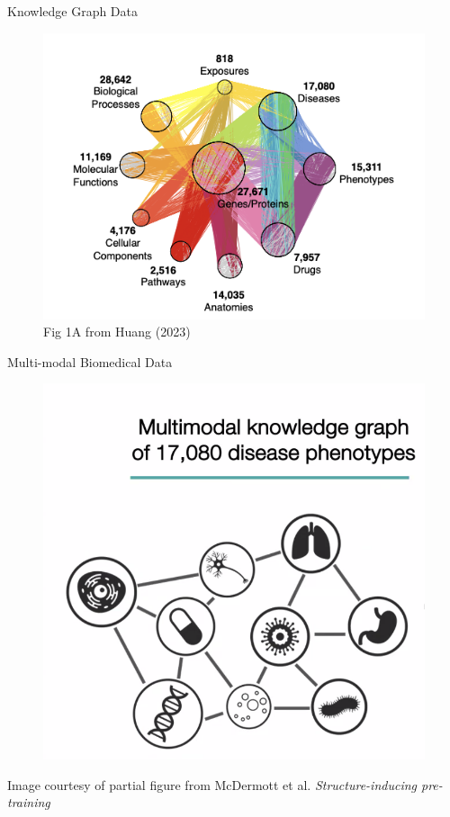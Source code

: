 \documentclass{beamer}
\begin{document}
\begin{frame}{Knowledge Graph Data}
    \begin{figure}
        \centering 
        \includegraphics{txGNN_KG.png}
        \caption{Fig 1A from Huang (2023) \cite{huang_zero-shot_2023}}
    \end{figure}
\end{frame}
\begin{frame}{Multi-modal Biomedical Data}
    \begin{figure}
        \centering 
        \includegraphics[scale=0.2]{MultimodalPreview.png}
    \end{figure}
    Image courtesy of partial figure from McDermott et al. {\it Structure-inducing pre-training} \cite{mcdermott_structure-inducing_2023}
\end{frame}
\end{document}
